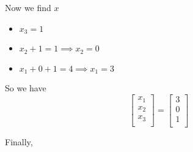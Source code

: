 \documentclass[12pt,letterpaper]{article}
\begin{document}
\begin{enumerate}
\begin{enumerate}
          Now we find $x$

          \begin{itemize}
            \item $            x_3 = 1$
            \item $      x_2 + 1   = 1 \implies x_2 = 0$
            \item $x_1 + 0   + 1   = 4 \implies x_1 = 3$
          \end{itemize}

          So we have
          \[
            \begin{bmatrix}
              x_1 \\
              x_2 \\
              x_3 \\
            \end{bmatrix}
            =
            \begin{bmatrix}
              3 \\
              0 \\
              1 \\
            \end{bmatrix}
          \]

          Finally,


\end{enumerate}
\end{enumerate}
\end{document}
